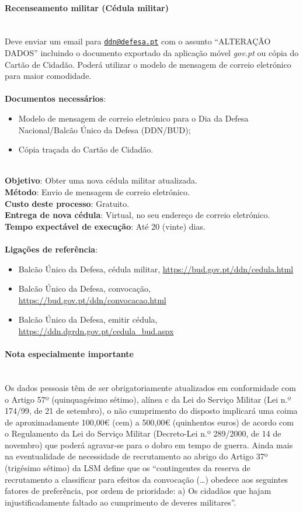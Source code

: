 \paragraph{Recenseamento militar (Cédula militar)}
\leavevmode\\[4pt]
Deve enviar um email para
\href{mailto:ddn@defesa.pt}{\nolinkurl{ddn@defesa.pt}} com o assunto
``ALTERAÇÃO DADOS'' incluindo o documento exportado da aplicação móvel
\emph{gov.pt} ou cópia do Cartão de Cidadão. Poderá utilizar o modelo de
mensagem de correio eletrónico para maior comodidade. \\
\\
\textbf{Documentos necessários}:
\begin{itemize}
	\item Modelo de mensagem de correio eletrónico para o Dia da Defesa Nacional/Balcão Único da Defesa (DDN/BUD);
	\item Cópia traçada do Cartão de Cidadão.
\end{itemize}
\leavevmode\\
\textbf{Objetivo}: Obter uma nova cédula militar atualizada. \\
\textbf{Método}: Envio de mensagem de correio eletrónico. \\
\textbf{Custo deste processo}: Gratuito. \\
\textbf{Entrega de nova cédula}: Virtual, no seu endereço de correio eletrónico. \\
\textbf{Tempo expectável de	execução}: Até 20 (vinte) dias. \\
\\
\textbf{Ligações de referência}:
\begin{itemize}
	\item Balcão Único da Defesa, cédula militar, \url{https://bud.gov.pt/ddn/cedula.html}
	\item Balcão Único da Defesa, convocação, \url{https://bud.gov.pt/ddn/convocacao.html}
	\item Balcão Único da Defesa, emitir cédula, \url{https://ddn.dgrdn.gov.pt/cedula\_bud.aspx}
\end{itemize}

\paragraph{Nota especialmente importante}
\leavevmode\\[4pt]
Os dados pessoais têm de ser obrigatoriamente atualizados em
conformidade com o Artigo 57º (quinquagésimo sétimo), alínea c da Lei do
Serviço Militar (Lei n.º 174/99, de 21 de setembro), o não cumprimento
do disposto implicará uma coima de aproximadamente 100,00€ (cem) a
500,00€ (quinhentos euros) de acordo com o Regulamento da Lei do Serviço
Militar (Decreto-Lei n.º 289/2000, de 14 de novembro) que poderá
agravar-se para o dobro em tempo de guerra. Ainda mais na eventualidade
de necessidade de recrutamento ao abrigo do Artigo 37º (trigésimo
sétimo) da LSM define que os ``contingentes da reserva de recrutamento a
classificar para efeitos da convocação (\ldots) obedece aos seguintes
fatores de preferência, por ordem de prioridade: a) Os cidadãos que
hajam injustificadamente faltado ao cumprimento de deveres militares''.

